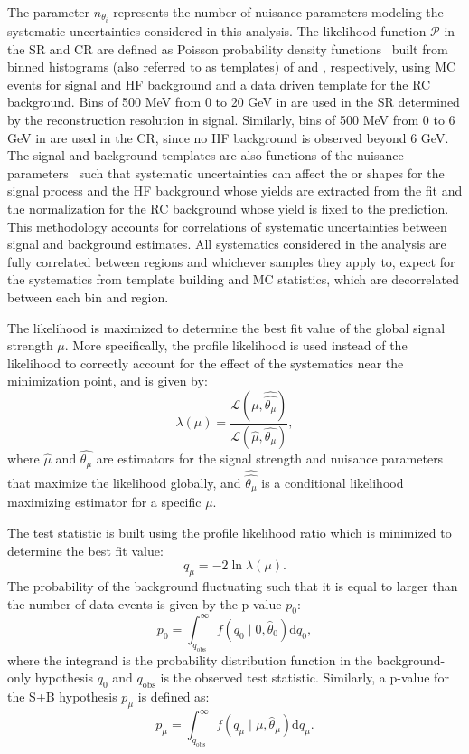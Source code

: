 The parameter $n_{\theta_i}$ represents the number of nuisance parameters modeling the systematic uncertainties considered in this analysis. The likelihood function $\mathcal{P}$ in the SR and CR are defined as Poisson probability density functions~\cite{Cranmer:1456844} built from binned histograms (also referred to as templates) of \mhnl and \mdv, respectively, using MC events for signal and HF background and a data driven template for the RC background. Bins of 500 MeV from 0 to 20 GeV in \mhnl are used in the SR determined by the \mhnl reconstruction resolution in signal. Similarly, bins of 500 MeV from 0 to 6 GeV in \mdv are used in the CR, since no HF background is observed beyond 6 GeV. The signal and background templates are also functions of the nuisance parameters~\cite{Cranmer:1456844} such that systematic uncertainties can affect the \mhnl or \mdv shapes for the signal process and the HF background whose yields are extracted from the fit and the normalization for the RC background whose yield is fixed to the prediction. This methodology accounts for correlations of systematic uncertainties between signal and background estimates. All systematics considered in the analysis are fully correlated between regions and whichever samples they apply to, expect for the systematics from template building and MC statistics, which are decorrelated between each bin and region. 

The likelihood is maximized to determine the best fit value of the global signal strength $\mu$. More specifically, the profile likelihood is used instead of the likelihood to correctly account for the effect of the systematics near the minimization point, and is given by:
\begin{equation}
    \lambda(\mu) = \frac{\mathcal{L}(\mu,\hat{\hat{\theta_\mu}})}{\mathcal{L}(\hat{\mu},\hat{\theta_\mu})},
\end{equation}
where $\hat{\mu}$ and $\hat{\theta_\mu}$ are estimators for the signal strength and nuisance parameters that maximize the likelihood globally, and $\hat{\hat{\theta_\mu}}$ is a conditional likelihood maximizing estimator for a specific $\mu$. 

The test statistic is built using the profile likelihood ratio which is minimized to determine the best fit value:
\begin{equation}
    q_{\mu} = -2\ln{\lambda(\mu)}.
\end{equation}
The probability of the background fluctuating such that it is equal to larger than the number of data events is given by the p-value $p_0$:
\begin{equation}
    p_0=\int_{q_{\mathrm{obs}}}^{\infty} f\left(q_0 \mid 0, \hat{\theta}_0\right) \mathrm{d} q_0,
\end{equation}
where the integrand is the probability distribution function in the background-only hypothesis $q_0$ and $q_{\mathrm{obs}}$ is the observed test statistic. Similarly, a p-value for the S+B hypothesis $p_{\mu}$ is defined as:
\begin{equation}
    p_\mu=\int_{q_{\mathrm{obs}}}^{\infty} f\left(q_\mu \mid \mu, \hat{\theta}_\mu\right) \mathrm{d} q_\mu.
\end{equation}

